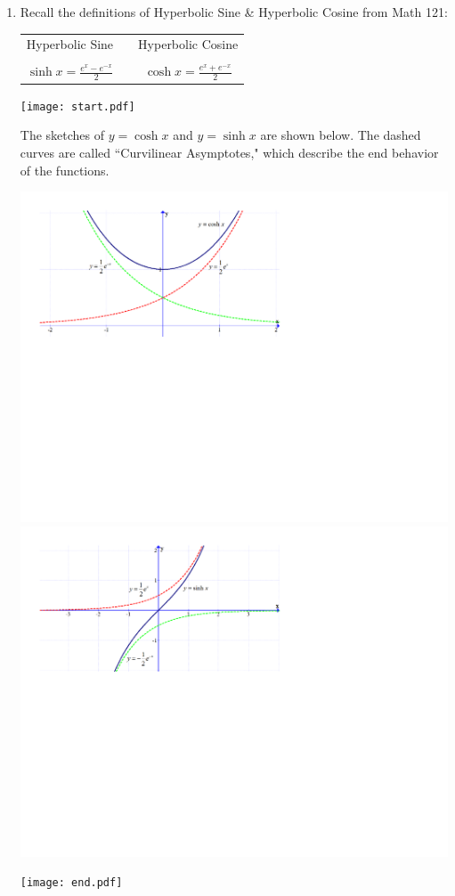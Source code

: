 \documentclass[12pt]{article}
\begin{document}
\begin{enumerate}
\begin{enumerate}
\end{enumerate}

\item Recall the definitions of Hyperbolic Sine \& Hyperbolic Cosine from Math 121:

\begin{center}
\begin{tabular}{ccc}
Hyperbolic Sine & & Hyperbolic Cosine\\
& & \\
$\sinh{x}=\frac{e^x-e^{-x}}{2}$ & \hspace{1 cm} & $\cosh{x}=\frac{e^x+e^{-x}}{2}$
\end{tabular}
\end{center}

\smallskip

\texttt{[image: start.pdf]}
{The sketches of $y=\cosh{x}$ and $y=\sinh{x}$ are shown below.  The dashed curves are called ``Curvilinear Asymptotes," which describe the end behavior of the functions.\\
\begin{center}
\includegraphics[scale=0.6]{cosh.pdf}\\
\vspace{0.5 cm}
\includegraphics[scale=0.6]{sinh.pdf}
\end{center}}
\texttt{[image: end.pdf]}



\end{enumerate}
\end{document}
